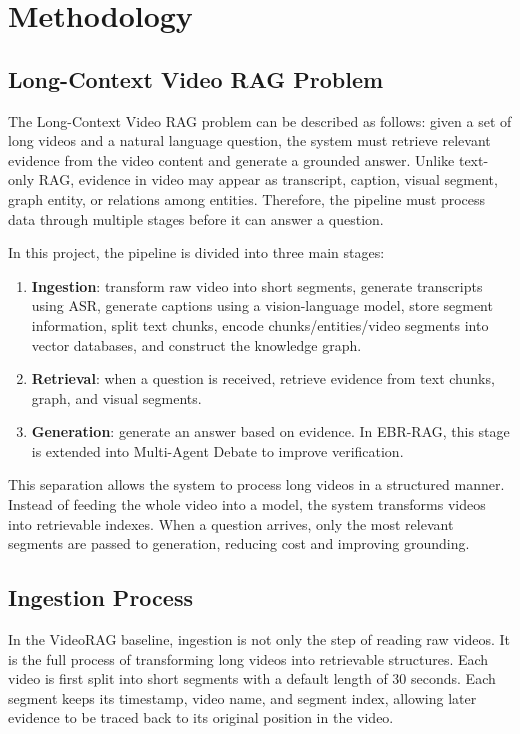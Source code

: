 \documentclass[12pt,a4paper]{article}
\begin{document}
\section{Methodology}

\subsection{Long-Context Video RAG Problem}

The Long-Context Video RAG problem can be described as follows: given a set of long videos and a natural language question, the system must retrieve relevant evidence from the video content and generate a grounded answer. Unlike text-only RAG, evidence in video may appear as transcript, caption, visual segment, graph entity, or relations among entities. Therefore, the pipeline must process data through multiple stages before it can answer a question.

In this project, the pipeline is divided into three main stages:
\begin{enumerate}
  \item \textbf{Ingestion}: transform raw video into short segments, generate transcripts using ASR, generate captions using a vision-language model, store segment information, split text chunks, encode chunks/entities/video segments into vector databases, and construct the knowledge graph.
  \item \textbf{Retrieval}: when a question is received, retrieve evidence from text chunks, graph, and visual segments.
  \item \textbf{Generation}: generate an answer based on evidence. In EBR-RAG, this stage is extended into Multi-Agent Debate to improve verification.
\end{enumerate}

This separation allows the system to process long videos in a structured manner. Instead of feeding the whole video into a model, the system transforms videos into retrievable indexes. When a question arrives, only the most relevant segments are passed to generation, reducing cost and improving grounding.

\subsection{Ingestion Process}

In the VideoRAG baseline, ingestion is not only the step of reading raw videos. It is the full process of transforming long videos into retrievable structures. Each video is first split into short segments with a default length of 30 seconds. Each segment keeps its timestamp, video name, and segment index, allowing later evidence to be traced back to its original position in the video.
\end{document}
